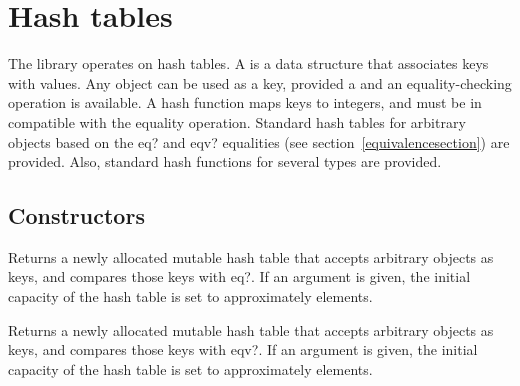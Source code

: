 \section{Hash tables}
\label{hashtablesection}

The  library operates on hash tables.
A  is a data structure that associates keys with values.
Any object can be used as a key, provided a 
and an equality-checking operation is available.  A hash function maps
keys to integers, and must be in compatible with the equality
operation.  Standard hash tables for arbitrary objects based on the
{\cf eq?} and {\cf eqv?} equalities (see
section~\ref{equivalencesection}) are provided.  Also, standard hash
functions for several types are provided.

\subsection{Constructors}


\begin{entry}{%
}

Returns a newly allocated mutable hash table that accepts arbitrary objects as keys, 
and compares those keys with {\cf eq?}. If an argument is given, the initial 
capacity of the hash table is set to approximately  elements.

\end{entry}

\begin{entry}{%
}

Returns a newly allocated mutable hash table that accepts arbitrary objects as keys, 
and compares those keys with {\cf eqv?}.
If an argument is given, the initial 
capacity of the hash table is set to approximately  elements.

\end{entry}

